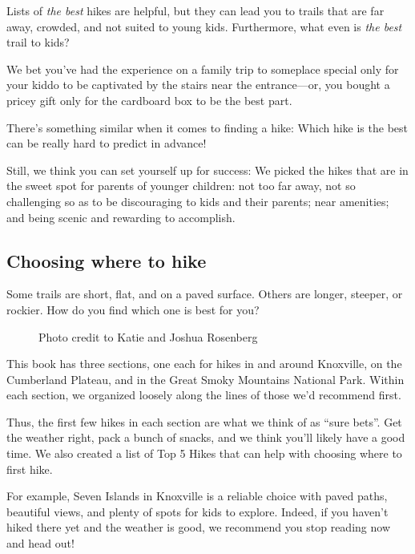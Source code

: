 \documentclass[
  letterpaper,
  DIV=11,
  numbers=noendperiod]{scrreprt}
\makeatletter
\newcommand*\pandocbounded[1]{%
  \sbox\pandoc@box{#1}%
  \Gscale@div\@tempa{\textheight}{\dimexpr\ht\pandoc@box+\dp\pandoc@box\relax}%
  \Gscale@div\@tempb{\linewidth}{\wd\pandoc@box}%
  \ifdim\@tempb\p@<\@tempa\p@\let\@tempa\@tempb\fi%
  \ifdim\@tempa\p@<\p@\scalebox{\@tempa}{\usebox\pandoc@box}%
  \else\usebox{\pandoc@box}%
  \fi%
}
\makeatother
\begin{document}
Lists of \emph{the best} hikes are helpful, but they can lead you to
trails that are far away, crowded, and not suited to young kids.
Furthermore, what even is \emph{the best} trail to kids?

We bet you've had the experience on a family trip to someplace special
only for your kiddo to be captivated by the stairs near the
entrance---or, you bought a pricey gift only for the cardboard box to be
the best part.

There's something similar when it comes to finding a hike: Which hike is
the best can be really hard to predict in advance!

Still, we think you can set yourself up for success: We picked the hikes
that are in the sweet spot for parents of younger children: not too far
away, not so challenging so as to be discouraging to kids and their
parents; near amenities; and being scenic and rewarding to accomplish.

\subsection{Choosing where to hike}\label{choosing-where-to-hike}

Some trails are short, flat, and on a paved surface. Others are longer,
steeper, or rockier. How do you find which one is best for you?

\begin{figure}[H]

{\centering \pandocbounded{\texttt{[image: img/rocky trail.jpg]}}

}

\caption{Photo credit to Katie and Joshua Rosenberg}

\end{figure}%

This book has three sections, one each for hikes in and around
Knoxville, on the Cumberland Plateau, and in the Great Smoky Mountains
National Park. Within each section, we organized loosely along the lines
of those we'd recommend first.

Thus, the first few hikes in each section are what we think of as ``sure
bets''. Get the weather right, pack a bunch of snacks, and we think
you'll likely have a good time. We also created a list of Top 5 Hikes
that can help with choosing where to first hike.

For example, Seven Islands in Knoxville is a reliable choice with paved
paths, beautiful views, and plenty of spots for kids to explore. Indeed,
if you haven't hiked there yet and the weather is good, we recommend you
stop reading now and head out!
\end{document}
